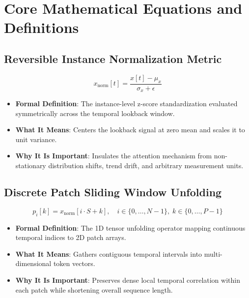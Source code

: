 \documentclass[11pt,a4paper]{article}
\theoremstyle{definition}
\begin{document}
\section{Core Mathematical Equations and Definitions}

\subsection{Reversible Instance Normalization Metric}
{\boldmath
\begin{equation}
x_{\text{norm}}[t] = \frac{x[t] - \mu_x}{\sigma_x + \epsilon}
\end{equation}
}
\begin{itemize}
    \item \textbf{Formal Definition}: The instance-level z-score standardization evaluated symmetrically across the temporal lookback window.
    \item \textbf{What It Means}: Centers the lookback signal at zero mean and scales it to unit variance.
    \item \textbf{Why It Is Important}: Insulates the attention mechanism from non-stationary distribution shifts, trend drift, and arbitrary measurement units.
\end{itemize}

\subsection{Discrete Patch Sliding Window Unfolding}
{\boldmath
\begin{equation}
p_i[k] = x_{\text{norm}}[i \cdot S + k], \quad i \in \{0, \dots, N-1\}, \; k \in \{0, \dots, P-1\}
\end{equation}
}
\begin{itemize}
    \item \textbf{Formal Definition}: The 1D tensor unfolding operator mapping continuous temporal indices to 2D patch arrays.
    \item \textbf{What It Means}: Gathers contiguous temporal intervals into multi-dimensional token vectors.
    \item \textbf{Why It Is Important}: Preserves dense local temporal correlation within each patch while shortening overall sequence length.
\end{itemize}
\end{document}
